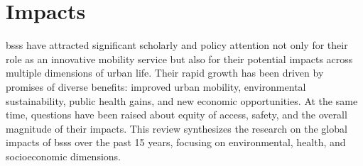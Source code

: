 \section{Impacts}
\label{sec:impacts_of_bss}

\acp{bss} have attracted significant scholarly and policy attention not only for their role as an innovative mobility service but also for their potential impacts across multiple dimensions of urban life. Their rapid growth has been driven by promises of diverse benefits: improved urban mobility, environmental sustainability, public health gains, and new economic opportunities. At the same time, questions have been raised about equity of access, safety, and the overall magnitude of their impacts. This review synthesizes the research on the global impacts of \acp{bss} over the past 15 years, focusing on environmental, health, and socioeconomic dimensions.







 

    